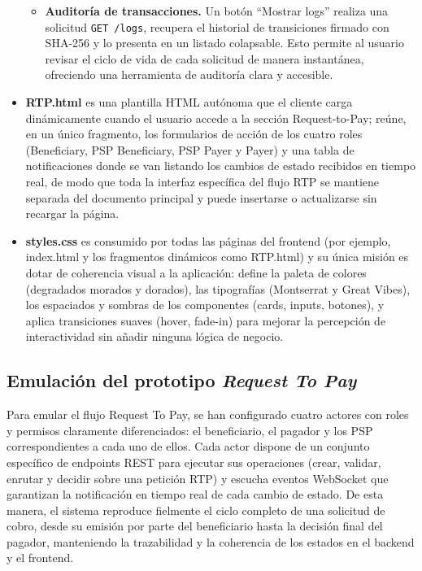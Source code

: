 \begin{itemize}
\begin{itemize}
            \item \textbf{Auditoría de transacciones.} Un botón ``Mostrar logs'' realiza una solicitud \texttt{GET /logs}, recupera el historial de transiciones firmado con SHA-256 y lo presenta en un listado colapsable. Esto permite al usuario revisar el ciclo de vida de cada solicitud de manera instantánea, ofreciendo una herramienta de auditoría clara y accesible.
        \end{itemize}

    \item \textbf{RTP.html} es una plantilla HTML autónoma que el cliente carga dinámicamente cuando el usuario accede a la sección Request-to-Pay; reúne, en un único fragmento, los formularios de acción de los cuatro roles (Beneficiary, PSP Beneficiary, PSP Payer y Payer) y una tabla de notificaciones donde se van listando los cambios de estado recibidos en tiempo real, de modo que toda la interfaz específica del flujo RTP se mantiene separada del documento principal y puede insertarse o actualizarse sin recargar la página.
    \item \textbf{styles.css} es consumido por todas las páginas del frontend (por ejemplo, index.html y los fragmentos dinámicos como RTP.html) y su única misión es dotar de coherencia visual a la aplicación: define la paleta de colores (degradados morados y dorados), las tipografías (Montserrat y Great Vibes), los espaciados y sombras de los componentes (cards, inputs, botones), y aplica transiciones suaves (hover, fade-in) para mejorar la percepción de interactividad sin añadir ninguna lógica de negocio. 
\end{itemize}

\subsection{Emulación del prototipo \textit{Request To Pay}}
\label{subsec:EmulacionRTP}
Para emular el flujo Request To Pay, se han configurado cuatro actores con roles y permisos claramente diferenciados: el beneficiario, el pagador y los PSP correspondientes a cada uno de ellos. Cada actor dispone de un conjunto específico de endpoints REST para ejecutar sus operaciones (crear, validar, enrutar y decidir sobre una petición RTP) y escucha eventos WebSocket que garantizan la notificación en tiempo real de cada cambio de estado. De esta manera, el sistema reproduce fielmente el ciclo completo de una solicitud de cobro, desde su emisión por parte del beneficiario hasta la decisión final del pagador, manteniendo la trazabilidad y la coherencia de los estados en el backend y el frontend.

